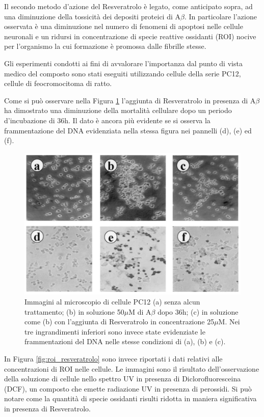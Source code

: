 \documentclass[a4paper, 12pt]{article}
\begin{document}
Il secondo metodo d'azione del Resveratrolo è legato, come anticipato sopra, ad una diminuzione della tossicità dei depositi proteici di A$\beta$. In particolare l'azione osservata è una diminuzione nel numero di fenomeni di  apoptosi nelle cellule neuronali e un ridursi in concentrazione di specie reattive ossidanti (ROI) nocive per l'organismo la cui formazione è promossa dalle fibrille stesse.

Gli esperimenti condotti ai fini di avvalorare l'importanza dal punto di vista medico del composto sono stati eseguiti utilizzando cellule della serie PC12, cellule di feocromocitoma di ratto.

Come si può osservare nella Figura \ref{fig:apo_resveratrolo} l'aggiunta di Resveratrolo in presenza di A$\beta$ ha dimostrato una diminuzione della mortalità cellulare dopo un periodo d'incubazione di 36h. Il dato è ancora più evidente se si osserva la frammentazione del DNA evidenziata nella stessa figura nei pannelli (d), (e) ed (f).

\begin{figure}[H]
	\centering
	\includegraphics[width=.9\linewidth]{immagini/apo_resveratrolo.png}
	\caption{Immagini al microscopio di cellule PC12 (a) senza alcun trattamento; (b) in soluzione 50$\mu$M di A$\beta$ dopo 36h; (c) in soluzione come (b) con l'aggiunta di Resveratrolo in concentrazione 25$\mu$M. Nei tre ingrandimenti inferiori sono invece state evidenziate le frammentazioni del DNA nelle stesse condizioni di (a), (b) e (c).}
	\label{fig:apo_resveratrolo}
\end{figure}

In Figura \ref{fig:roi_resveratrolo} sono invece riportati i dati relativi alle concentrazioni di ROI nelle cellule. Le immagini sono il risultato dell'osservazione della soluzione di cellule nello spettro UV in presenza di Diclorofluoresceina (DCF), un composto che emette radiazione UV in presenza di perossidi. Si può notare come la quantità di specie ossidanti risulti ridotta in maniera significativa in presenza di Resveratrolo. \cite{jang_protective_2003}
\end{document}
